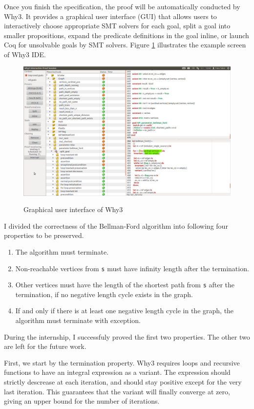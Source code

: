 \documentclass[a4paper,12pt]{article}
\begin{document}
Once you finish the specification, the proof will be automatically
conducted by Why3. It provides a graphical user interface (GUI) that
allows users to interactively choose appropriate SMT solvers for each
goal, split a goal into smaller propositions, expand the predicate
definitions in the goal inline, or launch Coq for unsolvable goals by
SMT solvers. Figure \ref{fig:why3ide} illustrates the example screen
of Why3 IDE.

\begin{figure}[h]
\centering \includegraphics[width=\textwidth]{why3.png}
\label{fig:why3ide}
\caption{Graphical user interface of Why3}
\end{figure}

I divided the correctness of the Bellman-Ford algorithm into following
four properties to be preserved.

\begin{enumerate}
\item The algorithm must terminate.
\item Non-reachable vertices from \texttt{s} must have infinity length
  after the termination.
\item Other vertices must have the length of the shortest path from
  \texttt{s} after the termination, if no negative length cycle exists
  in the graph.
\item If and only if there is at least one negative length cycle in
  the graph, the algorithm must terminate with exception.
\end{enumerate}

During the internship, I successfuly proved the first two
properties. The other two are left for the future work.

First, we start by the termination property. Why3 requires loops and
recursive functions to have an integral expression as a variant. The
expression should strictly descrease at each iteration, and should
stay positive except for the very last iteration. This guarantees that
the variant will finally converge at zero, giving an upper bound for
the number of iterations.
\end{document}
